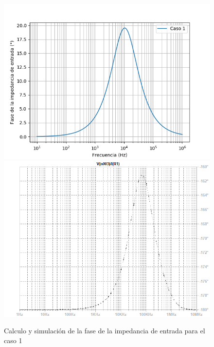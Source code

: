\begin{figure}[H]
\begin{centering}
\includegraphics[scale=0.5]{../Ex1/iA/Resources1a/zinpp1}\includegraphics[scale=0.4]{../Ex1/iA/Resources1a/zinpp1_sim}
\par\end{centering}
\caption{Calculo y simulación de la fase de la impedancia de entrada para el
caso 1}

\end{figure}

